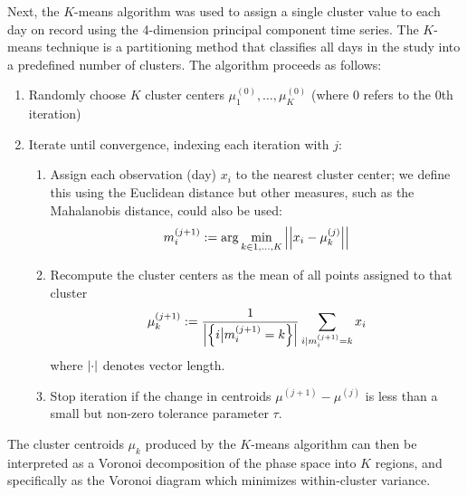 \documentclass{ametsoc}
\begin{document}
Next, the $K$-means algorithm was used to assign a single cluster value to each day on record using the 4-dimension principal component time series.
The $K$-means technique is a partitioning method that classifies all days in the study into a predefined number of clusters.
The algorithm proceeds as follows:
\begin{enumerate}
	\item Randomly choose $K$ cluster centers $\mu_1^{(0)}, \ldots, \mu_K^{(0)}$ (where $0$ refers to the $0$th iteration)
	\item Iterate until convergence, indexing each iteration with $j$:
	\begin{enumerate}
		\item Assign each observation (day) $x_i$ to the nearest cluster center; we define this using the Euclidean distance but other measures, such as the Mahalanobis distance, could also be used:
		\begin{equation}
			m_i^{(j+1)} := \arg\min_{k\in 1,\ldots,K} \abs{\abs{x_i - \mu_k^{(j)}}}
		\end{equation}
		\item Recompute the cluster centers as the mean of all points assigned to that cluster
		\begin{equation}
			\mu_k^{(j+1)} := \frac{1}{\abs{\qty{i \big| m_i^{(j+1)}=k}}} \sum_{i | m_i^{(j+1)}=k} x_i
		\end{equation}
		where $\abs{\cdot}$ denotes vector length.
		\item Stop iteration if the change in centroids $\mu^{(j+1)} - \mu^{(j)}$ is less than a small but non-zero tolerance parameter $\tau$.
	\end{enumerate}
\end{enumerate}
The cluster centroids $\mu_k$ produced by the $K$-means algorithm can then be interpreted as a Voronoi decomposition of the phase space into $K$ regions, and specifically as the Voronoi diagram which minimizes within-cluster variance.
\end{document}
